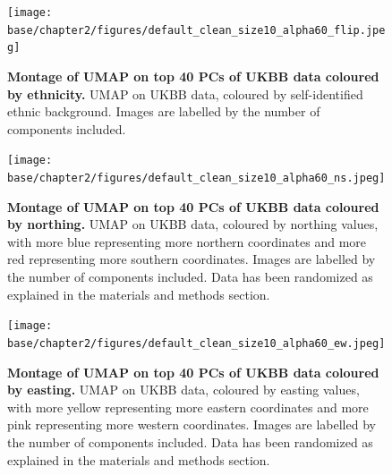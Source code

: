 \newpage

\begin{figure}[ht]
    \centering
    \texttt{[image: base/chapter2/figures/default\_clean\_size10\_alpha60\_flip.jpeg]}
    \caption[Montage of UMAP on top 40 PCs of UKBB data coloured by ethnicity]{\textbf{Montage of UMAP on top 40 PCs of UKBB data coloured by ethnicity.} UMAP on UKBB data, coloured by self-identified ethnic background. Images are labelled by the number of components included.}
    \label{fig:supp_montage_ukbb_eth}
\end{figure}

\newpage

\begin{figure}[ht]
    \centering
    \texttt{[image: base/chapter2/figures/default\_clean\_size10\_alpha60\_ns.jpeg]}
    \caption[Montage of UMAP on top 40 PCs of UKBB data coloured by northing]{\textbf{Montage of UMAP on top 40 PCs of UKBB data coloured by northing.} UMAP on UKBB data, coloured by northing values, with more blue representing more northern coordinates and more red representing more southern coordinates. Images are labelled by the number of components included. Data has been randomized as explained in the materials and methods section.}
    \label{fig:supp_montage_ukbb_ns}
\end{figure}

\newpage

\begin{figure}[ht]
    \centering
    \texttt{[image: base/chapter2/figures/default\_clean\_size10\_alpha60\_ew.jpeg]}
    \caption[Montage of UMAP on top 40 PCs of UKBB data coloured by easting]{\textbf{Montage of UMAP on top 40 PCs of UKBB data coloured by easting.} UMAP on UKBB data, coloured by easting values, with more yellow representing more eastern coordinates and more pink representing more western coordinates. Images are labelled by the number of components included. Data has been randomized as explained in the materials and methods section.}
    \label{fig:supp_montage_ukbb_ew}
\end{figure}

\newpage

